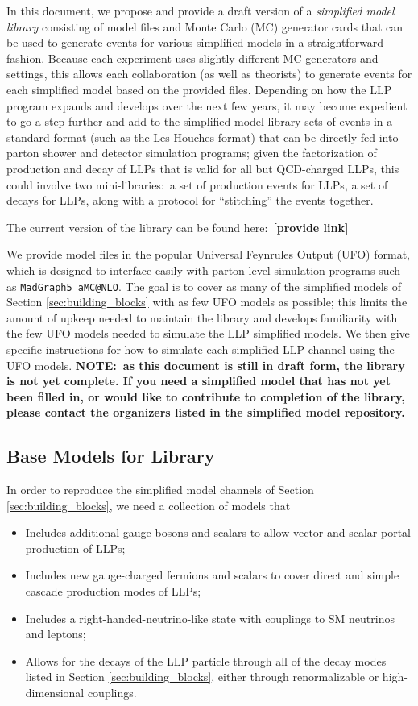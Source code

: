 In this document, we propose and provide a draft version of a \emph{simplified model library} consisting of model files and Monte Carlo (MC) generator cards that can be used to generate events for various simplified models in a straightforward fashion. Because each experiment uses slightly different MC generators and settings, this allows each collaboration (as well as theorists) to generate events for each simplified model based on the provided files. Depending on how the LLP program expands and develops over the next few years, it may become expedient to go a step further and add to the simplified model library sets of events in a standard format (such as the Les Houches format) that can be directly fed into parton shower and detector simulation programs; given the factorization of production and decay of LLPs that is valid for all but QCD-charged LLPs, this could involve two mini-libraries:~a set of production events for LLPs, a set of decays for LLPs, along with a protocol for ``stitching'' the events together.

The current version of the library can be found here:~{\bf [provide link]}

We provide model files in the popular Universal Feynrules Output (UFO) format, which is designed to interface easily with parton-level simulation programs such as \texttt{MadGraph5\_aMC@}\texttt{NLO}. The goal is to cover as many of the simplified models of Section \ref{sec:building_blocks} with as few UFO models as possible; this limits the amount of upkeep needed to maintain the library and develops familiarity with the few UFO models needed to simulate the LLP simplified models. We then give specific instructions for how to simulate each simplified LLP channel using the UFO models. {\bf NOTE:~as this document is still in draft form, the library is not yet complete. If you need a simplified model that has not yet been filled in, or would like to contribute to completion of the library, please contact the organizers listed in the simplified model repository.}

\subsection{Base Models for Library}

In order to reproduce the simplified model channels of Section \ref{sec:building_blocks}, we need a collection of models that
%
\begin{itemize}
\item Includes additional gauge bosons and scalars to allow vector and scalar portal production of LLPs;
\item Includes new gauge-charged fermions and scalars to cover direct and simple cascade production modes of LLPs;
\item Includes a right-handed-neutrino-like state with couplings to SM neutrinos and leptons;
\item Allows for the decays of the LLP particle through all of the decay modes listed in Section \ref{sec:building_blocks}, either through renormalizable or high-dimensional couplings.
\end{itemize}

